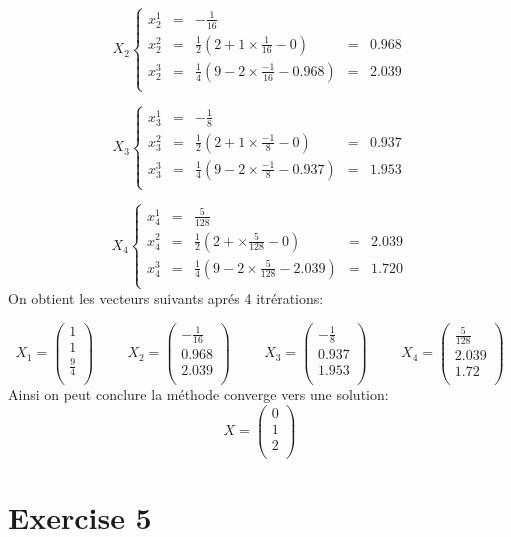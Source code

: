 \documentclass[a4paper,12pt]{article}
\begin{document}
$$
X_2 \left\{
\begin{array}{ccccc}
 x_2^1 & = & -\frac{1}{16} \\
 x_2^2 & = & \frac{1}{2}(2+1\times\frac{1}{16} - 0 )& = & 0.968 \\
 x_2^3 & = & \frac{1}{4}(9-2\times\frac{-1}{16} -0.968 )& =& 2.039\\
\end{array}
\right.
$$

$$
X_3 \left\{
\begin{array}{ccccc}
 x_3^1 & = & -\frac{1}{8} \\
 x_3^2 & = & \frac{1}{2}(2+1\times\frac{-1}{8} - 0 )& = & 0.937 \\
 x_3^3 & = & \frac{1}{4}(9-2\times\frac{-1}{8} -0.937 )& =& 1.953\\
\end{array}
\right.
$$

$$
X_4 \left\{
\begin{array}{ccccc}
 x_4^1 & = & \frac{5}{128} \\
 x_4^2 & = & \frac{1}{2}(2+\times\frac{5}{128} - 0 )& = & 2.039 \\
 x_4^3 & = & \frac{1}{4}(9-2\times\frac{5}{128} -2.039 )& =& 1.720\\
\end{array}
\right.
$$
On obtient les vecteurs suivants apr\'es 4 itr\'erations:

$$
X_1=\left(
\begin{array}{c}
 1\\
 1\\
 \frac{9}{4}\\
\end{array}
\right)
\hspace{1cm}
X_2 = \left(
\begin{array}{c}
 -\frac{1}{16}\\
 0.968\\
 2.039\\
\end{array}
\right)
\hspace{1cm}
X_3 = \left(
\begin{array}{c}
 -\frac{1}{8}\\
 0.937\\
 1.953\\
\end{array}
\right)
\hspace{1cm}
X_4 = \left(
\begin{array}{c}
 \frac{5}{128}\\
 2.039\\
 1.72\\
\end{array}
\right)
$$
Ainsi on peut conclure la m\'ethode converge vers une solution:
$$
X = \left(
\begin{array}{c}
 0\\
 1\\
 2\\
\end{array}
\right)
$$

\section{Exercise 5}
\end{document}
